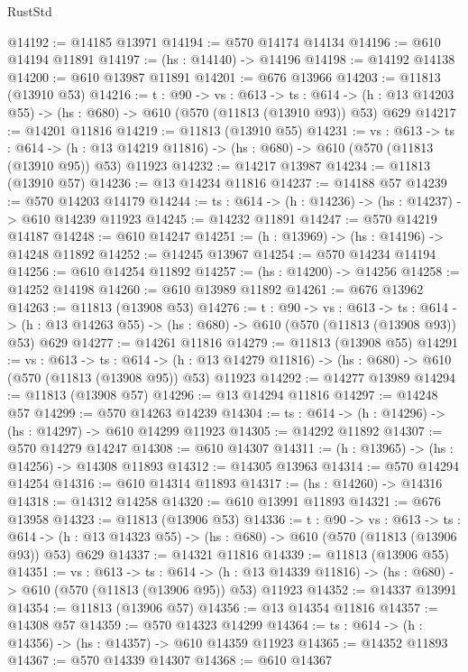 \begin{lexlean}{RustStd}
\begin{coremodule}
@14192 := @14185 @13971
@14194 := @570 @14174 @14134
@14196 := @610 @14194 @11891
@14197 := (hs : @14140) -> @14196
@14198 := @14192 @14138
@14200 := @610 @13987 @11891
@14201 := @676 @13966
@14203 := @11813 (@13910 @53)
@14216 := {t : @90} ->
  {vs : @613} ->
  {ts : @614} -> (h : @13 @14203 @55) -> (hs : @680) -> @610 (@570 (@11813 (@13910 @93)) @53) @629
@14217 := @14201 @11816
@14219 := @11813 (@13910 @55)
@14231 := {vs : @613} ->
  {ts : @614} ->
  (h : @13 @14219 @11816) -> (hs : @680) -> @610 (@570 (@11813 (@13910 @95)) @53) @11923
@14232 := @14217 @13987
@14234 := @11813 (@13910 @57)
@14236 := @13 @14234 @11816
@14237 := @14188 @57
@14239 := @570 @14203 @14179
@14244 := {ts : @614} -> (h : @14236) -> (hs : @14237) -> @610 @14239 @11923
@14245 := @14232 @11891
@14247 := @570 @14219 @14187
@14248 := @610 @14247
@14251 := (h : @13969) -> (hs : @14196) -> @14248 @11892
@14252 := @14245 @13967
@14254 := @570 @14234 @14194
@14256 := @610 @14254 @11892
@14257 := (hs : @14200) -> @14256
@14258 := @14252 @14198
@14260 := @610 @13989 @11892
@14261 := @676 @13962
@14263 := @11813 (@13908 @53)
@14276 := {t : @90} ->
  {vs : @613} ->
  {ts : @614} -> (h : @13 @14263 @55) -> (hs : @680) -> @610 (@570 (@11813 (@13908 @93)) @53) @629
@14277 := @14261 @11816
@14279 := @11813 (@13908 @55)
@14291 := {vs : @613} ->
  {ts : @614} ->
  (h : @13 @14279 @11816) -> (hs : @680) -> @610 (@570 (@11813 (@13908 @95)) @53) @11923
@14292 := @14277 @13989
@14294 := @11813 (@13908 @57)
@14296 := @13 @14294 @11816
@14297 := @14248 @57
@14299 := @570 @14263 @14239
@14304 := {ts : @614} -> (h : @14296) -> (hs : @14297) -> @610 @14299 @11923
@14305 := @14292 @11892
@14307 := @570 @14279 @14247
@14308 := @610 @14307
@14311 := (h : @13965) -> (hs : @14256) -> @14308 @11893
@14312 := @14305 @13963
@14314 := @570 @14294 @14254
@14316 := @610 @14314 @11893
@14317 := (hs : @14260) -> @14316
@14318 := @14312 @14258
@14320 := @610 @13991 @11893
@14321 := @676 @13958
@14323 := @11813 (@13906 @53)
@14336 := {t : @90} ->
  {vs : @613} ->
  {ts : @614} -> (h : @13 @14323 @55) -> (hs : @680) -> @610 (@570 (@11813 (@13906 @93)) @53) @629
@14337 := @14321 @11816
@14339 := @11813 (@13906 @55)
@14351 := {vs : @613} ->
  {ts : @614} ->
  (h : @13 @14339 @11816) -> (hs : @680) -> @610 (@570 (@11813 (@13906 @95)) @53) @11923
@14352 := @14337 @13991
@14354 := @11813 (@13906 @57)
@14356 := @13 @14354 @11816
@14357 := @14308 @57
@14359 := @570 @14323 @14299
@14364 := {ts : @614} -> (h : @14356) -> (hs : @14357) -> @610 @14359 @11923
@14365 := @14352 @11893
@14367 := @570 @14339 @14307
@14368 := @610 @14367

\end{coremodule}
\end{lexlean}
